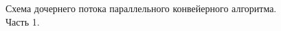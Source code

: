 \documentclass[12pt]{report}
\begin{document}
\begin{figure}[h!]
	\caption{Схема дочернего потока параллельного конвейерного алгоритма. Часть 1.}
	\label{figure:image}
\end{figure}
\end{document}
